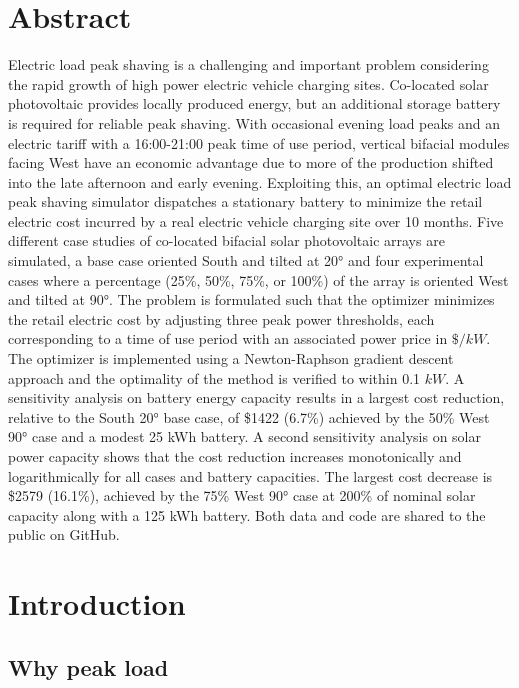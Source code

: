 \documentclass[
]{article}
\author{}
\date{}
\begin{document}
\hypertarget{abstract}{%
  \section{Abstract}\label{abstract}}

Electric load peak shaving is a challenging and important problem
considering the rapid growth of high power electric vehicle charging
sites. Co-located solar photovoltaic provides locally produced energy,
but an additional storage battery is required for reliable peak shaving.
With occasional evening load peaks and an electric tariff with a
16:00-21:00 peak time of use period, vertical bifacial modules facing
West have an economic advantage due to more of the production shifted
into the late afternoon and early evening. Exploiting this, an optimal
electric load peak shaving simulator dispatches a stationary battery to
minimize the retail electric cost incurred by a real electric vehicle
charging site over 10 months. Five different case studies of co-located
bifacial solar photovoltaic arrays are simulated, a base case oriented
South and tilted at 20° and four experimental cases where a percentage
(25\%, 50\%, 75\%, or 100\%) of the array is oriented West and tilted at
90°. The problem is formulated such that the optimizer minimizes the
retail electric cost by adjusting three peak power thresholds, each
corresponding to a time of use period with an associated power price in
\(\$/kW\). The optimizer is implemented using a Newton-Raphson gradient
descent approach and the optimality of the method is verified to within
0.1 \(kW\). A sensitivity analysis on battery energy capacity results in
a largest cost reduction, relative to the South 20° base case, of \$1422
(6.7\%) achieved by the 50\% West 90° case and a modest 25 kWh battery.
A second sensitivity analysis on solar power capacity shows that the
cost reduction increases monotonically and logarithmically for all cases
and battery capacities. The largest cost decrease is \$2579 (16.1\%),
achieved by the 75\% West 90° case at 200\% of nominal solar capacity
along with a 125 kWh battery. Both data and code are shared to the
public on GitHub.

\hypertarget{introduction}{%
  \section{Introduction}\label{introduction}}

\hypertarget{why-peak-load}{%
  \subsection{Why peak load}\label{why-peak-load}}
\end{document}
